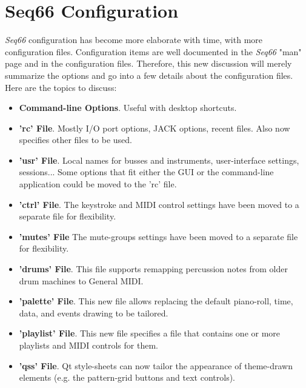 %
%
%

\section{Seq66 Configuration}
\label{sec:configuration}

   \textsl{Seq66} configuration has become more elaborate with time, with more
   configuration files.
   Configuration items are well documented in the
   \textsl{Seq66} "man" page and in the configuration files.
   Therefore, this new discussion will merely summarize the options and
   go into a few details about the configuration files.
   Here are the topics to discuss:

   \begin{itemize}
      \item \textbf{Command-line Options}. Useful with desktop shortcuts.
      \item \textbf{'rc' File}. Mostly I/O port options, JACK options, recent
         files.  Also now specifies other files to be used.
      \item \textbf{'usr' File}. Local names for busses and instruments,
         user-interface settings, sessions... Some options that fit either the
         GUI or the command-line application could be moved to the 'rc' file.
      \item \textbf{'ctrl' File}. The keystroke and MIDI control settings have
         been moved to a separate file for flexibility.
      \item \textbf{'mutes' File} The mute-groups settings have
         been moved to a separate file for flexibility.
      \item \textbf{'drums' File}.  This file supports remapping percussion
         notes from older drum machines to General MIDI.
      \item \textbf{'palette' File}. This new file allows replacing the default
         piano-roll, time, data, and events drawing to be tailored.
      \item \textbf{'playlist' File}. This new file specifies a file that
         contains one or more playlists and MIDI controls for them.
      \item \textbf{'qss' File}.  Qt style-sheets can now tailor the appearance
      of theme-drawn elements (e.g. the pattern-grid buttons and text controls).
   \end{itemize}

